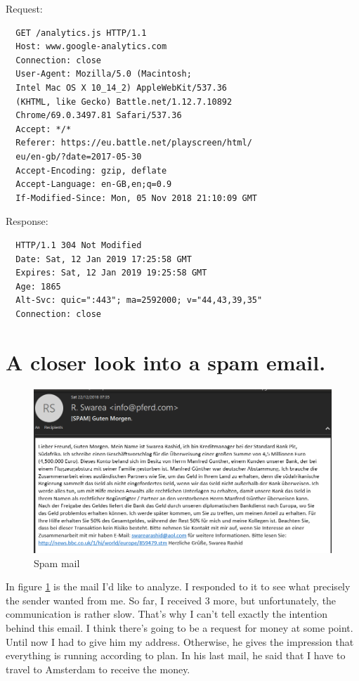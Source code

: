 \documentclass[12pt]{article}
\begin{document}
Request:
\begin{lstlisting}
  GET /analytics.js HTTP/1.1
  Host: www.google-analytics.com
  Connection: close
  User-Agent: Mozilla/5.0 (Macintosh; 
  Intel Mac OS X 10_14_2) AppleWebKit/537.36 
  (KHTML, like Gecko) Battle.net/1.12.7.10892 
  Chrome/69.0.3497.81 Safari/537.36
  Accept: */*
  Referer: https://eu.battle.net/playscreen/html/
  eu/en-gb/?date=2017-05-30
  Accept-Encoding: gzip, deflate
  Accept-Language: en-GB,en;q=0.9
  If-Modified-Since: Mon, 05 Nov 2018 21:10:09 GMT

\end{lstlisting}
Response:
\begin{lstlisting}
  HTTP/1.1 304 Not Modified
  Date: Sat, 12 Jan 2019 17:25:58 GMT
  Expires: Sat, 12 Jan 2019 19:25:58 GMT
  Age: 1865
  Alt-Svc: quic=":443"; ma=2592000; v="44,43,39,35"
  Connection: close
\end{lstlisting}






\newpage


\section{A closer look into a spam email.}

\begin{figure}[h]
 \includegraphics[width=15cm]{mail.png}
  \centering
  \caption{Spam mail}
  \label{fig:spam}
\end{figure}

In figure \ref{fig:spam} is the mail I'd like to analyze. I responded to it to see what precisely the sender wanted from me. So far, I received 3 more, but unfortunately, the communication is rather slow. That's why I can't tell exactly the intention behind this email. I think there's going to be a request for money at some point. Until now I had to give him my address. Otherwise, he gives the impression that everything is running according to plan. In his last mail, he said that I have to travel to Amsterdam to receive the money.
\end{document}
